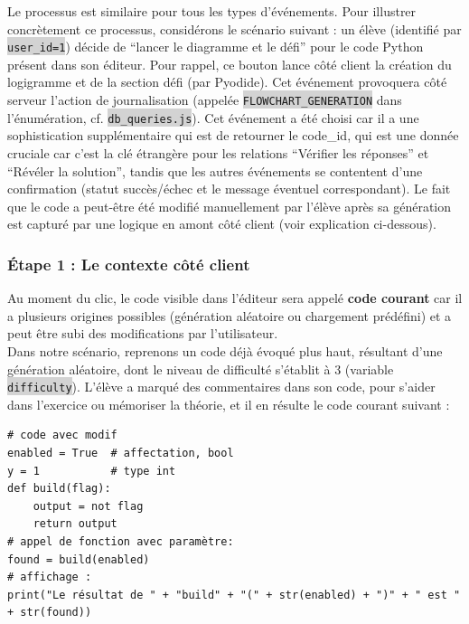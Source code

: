 \documentclass[11pt,a4paper]{article}
\newcommand{\code}[1]{\colorbox{lightgray}{\texttt{\small #1}}}
\begin{document}
Le processus est similaire pour tous les types d'événements. Pour illustrer concrètement ce processus, considérons le scénario suivant : un élève (identifié par \code{user\_id=1}) décide de ``lancer le diagramme et le défi'' pour le code Python présent dans son éditeur. Pour rappel, ce bouton lance côté client la création du logigramme et de la section défi (par Pyodide).  Cet événement provoquera côté serveur l'action  de journalisation (appelée \code{FLOWCHART\_GENERATION} dans l'énumération, cf. \code{db\_queries.js}). Cet événement a été choisi car il a une sophistication supplémentaire qui est de retourner le code\_id, qui est une donnée cruciale car c'est la clé étrangère pour les relations ``Vérifier les réponses'' et ``Révéler la solution'', tandis que les autres événements se contentent d'une confirmation (statut succès/échec et le message éventuel correspondant). Le fait que le code a peut-être été modifié manuellement par l'élève après sa génération est capturé par une logique en amont côté client (voir explication ci-dessous).

\subsubsection*{Étape 1 : Le contexte côté client}
Au moment du clic, le code visible dans l'éditeur sera appelé \textbf{code courant} car il a plusieurs origines possibles (génération aléatoire ou chargement prédéfini) et a peut être subi des modifications par l'utilisateur. \\
Dans notre scénario, reprenons un code déjà évoqué plus haut, résultant d'une génération aléatoire, dont le niveau de difficulté s'établit à 3 (variable \code{difficulty}). L'élève a marqué des commentaires dans son code, pour s'aider dans l'exercice ou mémoriser la théorie, et il en résulte le code courant suivant :
\begin{verbatim}
# code avec modif
enabled = True  # affectation, bool
y = 1           # type int
def build(flag):
    output = not flag
    return output
# appel de fonction avec paramètre:
found = build(enabled) 
# affichage :
print("Le résultat de " + "build" + "(" + str(enabled) + ")" + " est " + str(found))
\end{verbatim}
\end{document}

